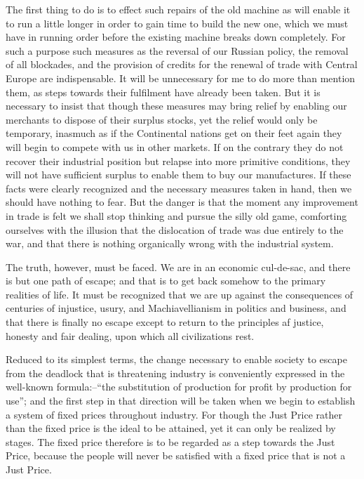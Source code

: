 \documentclass{book}
\begin{document}
The first thing to do is to effect such repairs of the old machine as will enable it to run a little longer in order to gain time to build the new one, which we must have in running order before the existing machine breaks down completely. For such a purpose such measures as the reversal of our Russian policy, the removal of all blockades, and the provision of credits for the renewal of trade with Central Europe are indispensable. It will be unnecessary for me to do more than mention them, as steps towards their fulfilment have already been taken. But it is necessary to insist that though these measures may bring relief by enabling our merchants to dispose of their surplus stocks, yet the relief would only be temporary, inasmuch as if the Continental nations get on their feet again they will begin to compete with us in other markets. If on the contrary they do not recover their industrial position but relapse into more primitive conditions, they will not have sufficient surplus to enable them to buy our manufactures. If these facts were clearly recognized and the necessary measures taken in hand, then we should have nothing to fear. But the danger is that the moment any improvement in trade is felt we shall stop thinking and pursue the silly old game, comforting ourselves with the illusion that the dislocation of trade was due entirely to the war, and that there is nothing organically wrong with the industrial system.

The truth, however, must be faced. We are in an economic cul-de-sac, and there is but one path of escape; and that is to get back somehow to the primary realities of life. It must be recognized that we are up against the consequences of centuries of injustice, usury, and Machiavellianism in politics and business, and that there is finally no escape except to return to the principles af justice, honesty and fair dealing, upon which all civilizations rest.

Reduced to its simplest terms, the change necessary to enable society to escape from the deadlock that is threatening industry is conveniently expressed in the well-known formula:–“the substitution of production for profit by production for use”; and the first step in that direction will be taken when we begin to establish a system of fixed prices throughout industry. For though the Just Price rather than the fixed price is the ideal to be attained, yet it can only be realized by stages. The fixed price therefore is to be regarded as a step towards the Just Price, because the people will never be satisfied with a fixed price that is not a Just Price.
\end{document}
